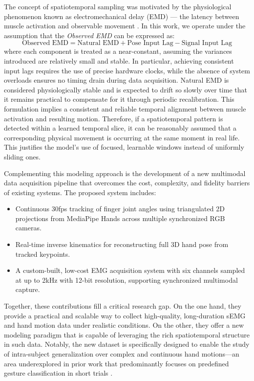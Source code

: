The concept of spatiotemporal sampling was motivated by the physiological phenomenon known as electromechanical delay (EMD) — the latency between muscle activation and observable movement \cite{ngeo2014continuous}. In this work, we operate under the assumption that the \textit{Observed EMD} can be expressed as:
\[
\text{Observed EMD} = \text{Natural EMD} + \text{Pose Input Lag} - \text{Signal Input Lag}
\]
where each component is treated as a near-constant, assuming the variances introduced are relatively small and stable. In particular, achieving consistent input lags requires the use of precise hardware clocks, while the absence of system overloads ensures no timing drain during data acquisition. Natural EMD is considered physiologically stable and is expected to drift so slowly over time that it remains practical to compensate for it through periodic recalibration. This formulation implies a consistent and reliable temporal alignment between muscle activation and resulting motion. Therefore, if a spatiotemporal pattern is detected within a learned temporal slice, it can be reasonably assumed that a corresponding physical movement is occurring at the same moment in real life. This justifies the model's use of focused, learnable windows instead of uniformly sliding ones.

Complementing this modeling approach is the development of a new multimodal data acquisition pipeline that overcomes the cost, complexity, and fidelity barriers of existing systems. The proposed system includes:
\begin{itemize}
    \item Continuous 30fps tracking of finger joint angles using triangulated 2D projections from MediaPipe Hands across multiple synchronized RGB cameras.
    \item Real-time inverse kinematics for reconstructing full 3D hand pose from tracked keypoints.
    \item A custom-built, low-cost EMG acquisition system with six channels sampled at up to 2kHz with 12-bit resolution, supporting synchronized multimodal capture.
\end{itemize}

Together, these contributions fill a critical research gap. On the one hand, they provide a practical and scalable way to collect high-quality, long-duration sEMG and hand motion data under realistic conditions. On the other, they offer a new modeling paradigm that is capable of leveraging the rich spatiotemporal structure in such data. Notably, the new dataset is specifically designed to enable the study of intra-subject generalization over complex and continuous hand motions—an area underexplored in prior work that predominantly focuses on predefined gesture classification in short trials \cite{salter2024emg2pose}.

